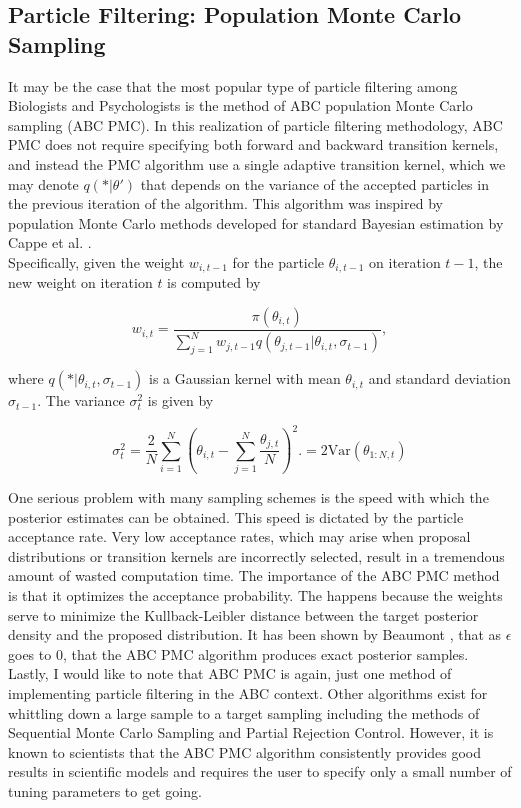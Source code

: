 \documentclass[12pt]{article}
\begin{document}
\subsection{Particle Filtering: Population Monte Carlo Sampling}

It may be the case that the most popular type of particle filtering among Biologists and Psychologists is the method of ABC population Monte Carlo sampling (ABC PMC). In this realization of particle filtering methodology, ABC PMC does not require specifying both forward and backward transition kernels, and instead the PMC algorithm use a single adaptive transition kernel, which we may denote $q(* | \theta')$ that depends on the variance of the accepted particles in the previous iteration of the algorithm. This algorithm was inspired by population Monte Carlo methods developed for standard Bayesian estimation by Cappe et al. \cite{cappe}.\\

Specifically, given the weight $w_{i,t-1}$ for the particle $\theta_{i,t-1}$ on iteration $t-1$, the new weight on iteration $t$ is computed by

$$ w_{i,t} = \frac{\pi(\theta_{i,t})}{ \sum_{j=1}^{N} w_{ j, t-1} q ( \theta_{j,t-1} | \theta_{i,t} ,\sigma_{t-1})},$$

where $q(*|\theta_{i,t}, \sigma_{t-1})$ is a Gaussian kernel with mean $\theta_{i,t}$ and standard deviation $\sigma_{t-1}$. The variance $\sigma^2_t$ is given by 

$$ \sigma^2_t = \frac{2}{N} \sum_{i=1}^N \left( \theta_{i,t} - \sum_{j=1}^N \frac{\theta_{j,t}}{N} \right)^2.= 2\textrm{Var}(\theta_{1:N,t})$$

One serious problem with many sampling schemes is the speed with which the posterior estimates can be obtained. This speed is dictated by the particle acceptance rate. Very low acceptance rates, which may arise when proposal distributions or transition kernels are incorrectly selected, result in a tremendous amount of wasted computation time. The importance of the ABC PMC method is that it optimizes the acceptance probability. The happens because the weights serve to minimize the Kullback-Leibler distance between the target posterior density and the proposed distribution. It has been shown by Beaumont \cite{beau}, that as $\epsilon$ goes to $0$, that the ABC PMC algorithm produces exact posterior samples. Lastly, I would like to note that ABC PMC is again, just one method of implementing particle filtering in the ABC context. Other algorithms exist for whittling down a large sample to a target sampling including the methods of Sequential Monte Carlo Sampling and Partial Rejection Control. However, it is known to scientists that the ABC PMC algorithm consistently provides good results in scientific models and requires the user to specify only a small number of tuning parameters to get going. 
\end{document}
